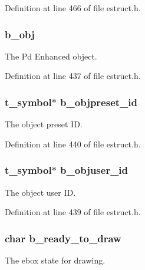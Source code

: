 Definition at line 466 of file estruct.\-h.

\hypertarget{struct__ebox_a384a670299e98768527fbe457de9a38a}{
\subsubsection[{b\-\_\-obj}]{ b\-\_\-obj}}\label{struct__ebox_a384a670299e98768527fbe457de9a38a}
The Pd Enhanced object. 

Definition at line 437 of file estruct.\-h.

\hypertarget{struct__ebox_adc377263d208d1051f4a0997868b1155}{
\subsubsection[{b\-\_\-objpreset\-\_\-id}]{\setlength{\rightskip}{0pt plus 5cm}t\-\_\-symbol$\ast$ b\-\_\-objpreset\-\_\-id}}\label{struct__ebox_adc377263d208d1051f4a0997868b1155}
The object preset I\-D. 

Definition at line 440 of file estruct.\-h.

\hypertarget{struct__ebox_ae324f65e10196cc7e166652e8d7d394d}{
\subsubsection[{b\-\_\-objuser\-\_\-id}]{\setlength{\rightskip}{0pt plus 5cm}t\-\_\-symbol$\ast$ b\-\_\-objuser\-\_\-id}}\label{struct__ebox_ae324f65e10196cc7e166652e8d7d394d}
The object user I\-D. 

Definition at line 439 of file estruct.\-h.

\hypertarget{struct__ebox_a234ea03e103bd45f5fa1d27b8e69b5dd}{
\subsubsection[{b\-\_\-ready\-\_\-to\-\_\-draw}]{\setlength{\rightskip}{0pt plus 5cm}char b\-\_\-ready\-\_\-to\-\_\-draw}}\label{struct__ebox_a234ea03e103bd45f5fa1d27b8e69b5dd}
The ebox state for drawing. 

